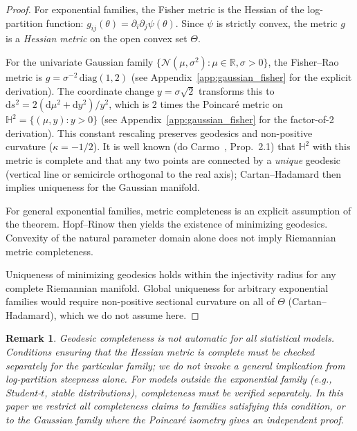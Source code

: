 \documentclass[a4paper,fleqn]{cas-dc}
\newtheorem{remark}{Remark}
\newcommand{\R}{\mathbb{R}}
\begin{document}
\begin{proof}
  For exponential families, the Fisher metric is the Hessian of the
  log-partition function: $g_{ij}(\theta) = \partial_i\partial_j\psi(\theta)$.
  Since $\psi$ is strictly convex, the metric $g$ is a \emph{Hessian
  metric} on the open convex set $\Theta$.

  For the univariate Gaussian family $\{\mathcal{N}(\mu,\sigma^2):\mu\in\R,\sigma>0\}$,
  the Fisher--Rao metric is $g = \sigma^{-2}\,\mathrm{diag}(1,2)$
  (see Appendix~\ref{app:gaussian_fisher} for the explicit derivation).
  The coordinate change $y=\sigma\sqrt{2}$ transforms this to
  $\mathrm{d}s^2 = 2(\mathrm{d}\mu^2+\mathrm{d}y^2)/y^2$,
  which is $2$ times the Poincar\'{e} metric on $\mathbb{H}^2=\{(\mu,y):y>0\}$
  (see Appendix~\ref{app:gaussian_fisher} for the factor-of-2 derivation).
  This constant rescaling preserves geodesics and non-positive curvature
  ($\kappa = -1/2$).
  It is well known (do Carmo~\cite{do2002riemannian}, Prop.~2.1) that
  $\mathbb{H}^2$ with this metric is complete and that any two points are
  connected by a \emph{unique} geodesic (vertical line or semicircle
  orthogonal to the real axis); Cartan--Hadamard then implies uniqueness
  for the Gaussian manifold.

  For general exponential families, metric completeness is an explicit
  assumption of the theorem. Hopf--Rinow then yields the existence of
  minimizing geodesics. Convexity of the natural parameter domain alone
  does not imply Riemannian metric completeness.

  Uniqueness of minimizing geodesics holds within the injectivity radius
  for any complete Riemannian manifold.  Global uniqueness for arbitrary
  exponential families would require non-positive sectional curvature on
  all of $\Theta$ (Cartan--Hadamard), which we do not assume here.
\end{proof}

\begin{remark}%
  \label{rem:completeness_general}
  Geodesic completeness is not automatic for all statistical models.
  Conditions ensuring that the Hessian metric is complete must be
  checked separately for the particular family; we do not invoke a
  general implication from log-partition steepness alone.
  For models outside the exponential family (e.g., Student-$t$, stable
  distributions), completeness must be verified separately.
  In this paper we restrict all completeness claims to families satisfying
  this condition, or to the Gaussian family where the Poincar\'{e}
  isometry gives an independent proof.
\end{remark}
\end{document}
